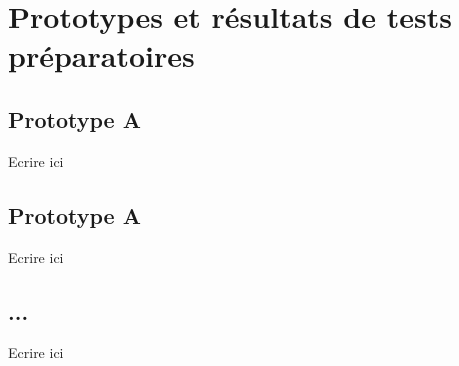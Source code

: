 \chapter{Prototypes et résultats de tests préparatoires}

\section{Prototype A}
Ecrire ici

\section{Prototype A}
Ecrire ici

\section{...}
Ecrire ici




\clearpage
